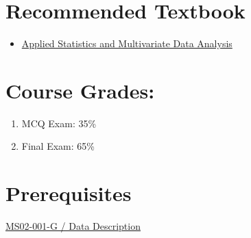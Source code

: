 \documentclass[
  letterpaper,
  DIV=11,
  numbers=noendperiod]{scrreprt}
\providecommand{\tightlist}{%
  \setlength{\itemsep}{0pt}\setlength{\parskip}{0pt}}\usepackage{longtable,booktabs,array}
\begin{document}
\section{Recommended Textbook}\label{recommended-textbook}

\begin{itemize}
\tightlist
\item
  \href{assets/applied-statistics-and-multivariate-data-analysis.pdf}{Applied
  Statistics and Multivariate Data Analysis}
\end{itemize}

\section{Course Grades:}\label{course-grades}

\begin{enumerate}
\def\labelenumi{\arabic{enumi}.}
\tightlist
\item
  MCQ Exam: 35\%
\item
  Final Exam: 65\%
\end{enumerate}

\section{Prerequisites}\label{prerequisites}

\href{./teaching/data-description.qmd}{MS02-001-G / Data Description}
\end{document}
